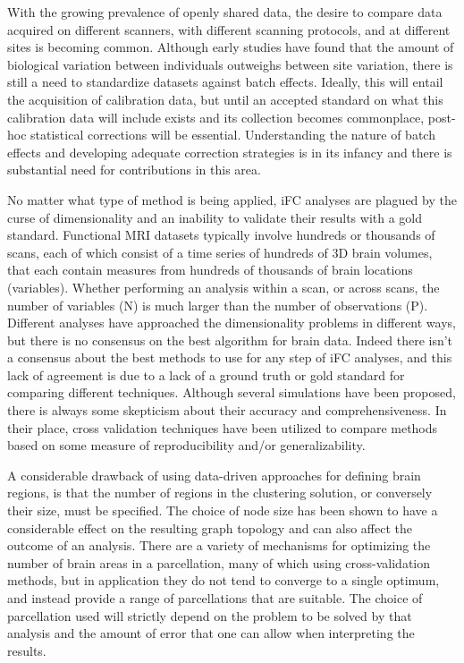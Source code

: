 With the growing prevalence of openly shared data, the desire to compare data
acquired on different scanners, with different scanning protocols, and at
different sites is becoming common. Although early studies have found that the
amount of biological variation between individuals outweighs between site
variation\cite{biswal}, there is still a need to standardize datasets against
batch effects\cite{YanStand}. Ideally, this will entail the acquisition of
calibration data, but until an accepted standard on what this calibration data
will include exists and its collection becomes commonplace, post-hoc
statistical corrections will be essential. Understanding the nature of batch
effects and developing adequate correction strategies is in its infancy and
there is substantial need for contributions in this area.  

No matter what type of method is being applied, iFC analyses are plagued by the
curse of dimensionality and an inability to validate their results with a gold
standard. Functional MRI datasets typically involve hundreds or thousands of
scans, each of which consist of a time series of hundreds of 3D brain volumes,
that each contain measures from hundreds of thousands of brain locations
(variables). Whether performing an analysis within a scan, or across scans, the
number of variables (N) is much larger than the number of observations (P).
Different analyses have approached the dimensionality problems in different
ways, but there is no consensus on the best algorithm for brain data. Indeed
there isn't a consensus about the best methods to use for any step of iFC
analyses, and this lack of agreement is due to a lack of a ground truth or gold
standard for comparing different techniques. Although several simulations have
been proposed, there is always some skepticism about their accuracy and
comprehensiveness. In their place, cross validation techniques have been
utilized to compare methods based on some measure of reproducibility and/or
generalizability.

A considerable drawback of using data-driven approaches for defining brain
regions, is that the number of regions in the clustering solution, or
conversely their size, must be specified. The choice of node size has been
shown to have a considerable effect on the resulting graph topology
\cite{Zalesky} and can also affect the outcome of an analysis\cite{Cecci_2009}.
There are a variety of mechanisms for optimizing the number of brain areas in a
parcellation, many of which using cross-validation methods, but in application
they do not tend to converge to a single optimum, and instead provide a range
of parcellations that are suitable\cite{craddock2012}. The choice of
parcellation used will strictly depend on the problem to be solved by that
analysis and the amount of error that one can allow when interpreting the
results. 


